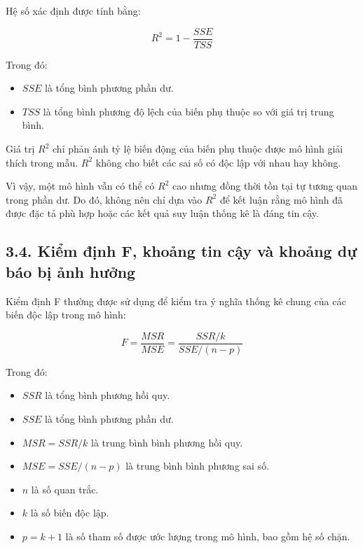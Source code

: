 \documentclass[12pt,a4paper]{article}
\begin{document}
Hệ số xác định được tính bằng:

\[
R^2
=
1-\frac{SSE}{TSS}
\]

Trong đó:

\begin{itemize}
    \item $SSE$ là tổng bình phương phần dư.
    
    \item $TSS$ là tổng bình phương độ lệch của biến phụ thuộc so với giá trị trung bình.
\end{itemize}

Giá trị $R^2$ chỉ phản ánh tỷ lệ biến động của biến phụ thuộc được mô hình giải thích trong mẫu. $R^2$ không cho biết các sai số có độc lập với nhau hay không.

Vì vậy, một mô hình vẫn có thể có $R^2$ cao nhưng đồng thời tồn tại tự tương quan trong phần dư. Do đó, không nên chỉ dựa vào $R^2$ để kết luận rằng mô hình đã được đặc tả phù hợp hoặc các kết quả suy luận thống kê là đáng tin cậy.


\subsection{3.4. Kiểm định F, khoảng tin cậy và khoảng dự báo bị ảnh hưởng}

Kiểm định F thường được sử dụng để kiểm tra ý nghĩa thống kê chung của các biến độc lập trong mô hình:

\[
F
=
\frac{MSR}{MSE}
=
\frac{SSR/k}{SSE/(n-p)}
\]

Trong đó:

\begin{itemize}
    \item $SSR$ là tổng bình phương hồi quy.
    
    \item $SSE$ là tổng bình phương phần dư.
    
    \item $MSR=SSR/k$ là trung bình bình phương hồi quy.
    
    \item $MSE=SSE/(n-p)$ là trung bình bình phương sai số.
    
    \item $n$ là số quan trắc.
    
    \item $k$ là số biến độc lập.
    
    \item $p=k+1$ là số tham số được ước lượng trong mô hình, bao gồm hệ số chặn.
\end{itemize}
\end{document}

